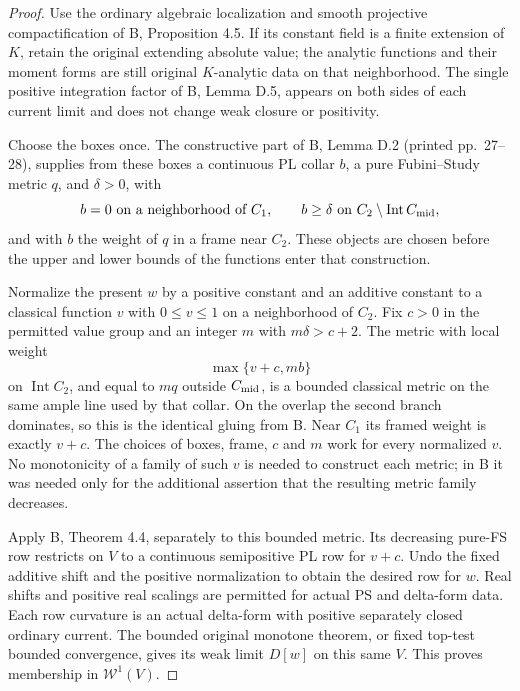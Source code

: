 \documentclass[11pt,a4paper]{article}
\numberwithin{equation}{section}
\theoremstyle{definition}
\theoremstyle{remark}
\begin{document}
\begin{proof}
Use the ordinary algebraic localization and smooth projective
compactification of B, Proposition 4.5. If its constant field is a
finite extension of $K$, retain the original extending absolute value;
the analytic functions and their moment forms are still original
$K$-analytic data on that neighborhood. The single positive
integration factor of B, Lemma D.5, appears on both sides of each
current limit and does not change weak closure or positivity.

Choose the boxes once. The constructive part of B, Lemma D.2
(printed pp.~27--28), supplies from these boxes a continuous PL collar
$b$, a pure Fubini--Study metric $q$, and $\delta>0$, with
\[
 b=0\text{ on a neighborhood of }C_1,
 \qquad b\ge\delta\text{ on }C_2\setminus\operatorname{Int}C_{\rm mid},
\]
and with $b$ the weight of $q$ in a frame near $C_2$. These objects
are chosen before the upper and lower bounds of the functions enter
that construction.

Normalize the present $w$ by a positive constant and an additive
constant to a classical function $v$ with $0\le v\le1$ on a
neighborhood of $C_2$. Fix $c>0$ in the permitted value group and
an integer $m$ with $m\delta>c+2$. The metric with local weight
\[
                         \max\{v+c,mb\}
\]
on $\operatorname{Int}C_2$, and equal to $mq$ outside
$C_{\rm mid}$, is a bounded classical metric on the same ample
line used by that collar. On the overlap the second branch dominates,
so this is the identical gluing from B. Near $C_1$ its framed weight
is exactly $v+c$. The choices of boxes, frame, $c$ and $m$ work for
every normalized $v$. No monotonicity of a family of such $v$ is
needed to construct each metric; in B it was needed only for the
additional assertion that the resulting metric family decreases.

Apply B, Theorem 4.4, separately to this bounded metric. Its decreasing
pure-FS row restricts on $V$ to a continuous semipositive PL row for
$v+c$. Undo the fixed additive shift and the positive normalization
to obtain the desired row for $w$. Real shifts and positive real
scalings are permitted for actual PS and delta-form data. Each row
curvature is an actual delta-form with positive separately closed
ordinary current. The bounded original monotone theorem, or fixed
top-test bounded convergence, gives its weak limit $D[w]$ on this
same $V$. This proves membership in $\mathcal W^1(V)$.
\end{proof}
\end{document}
